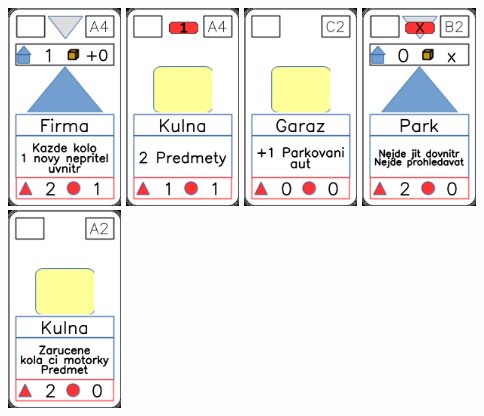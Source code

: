 \documentclass[a4paper]{article}
\begin{document}
	\includegraphics[width=3.0cm]{img-3_18}
	\includegraphics[width=3.0cm]{img-2_18}
	\includegraphics[width=3.0cm]{img-2_11}
	\includegraphics[width=3.0cm]{img-3_21}
	\includegraphics[width=3.0cm]{img-2_16}
\end{document}
